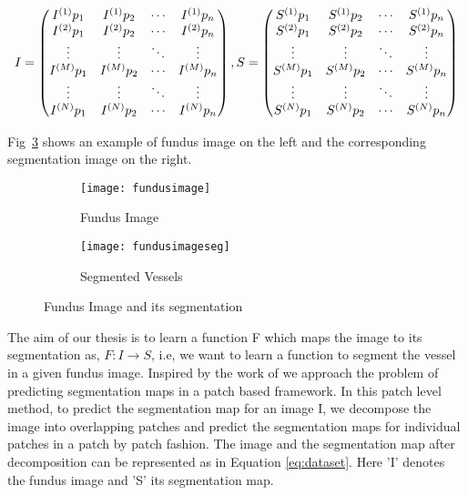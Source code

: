 \begin{equation}\label{eq:dataset}
I = 	
\begin{pmatrix}
I^{(1)}{p}_1 & I^{(1)}{p}_2 & \cdots & I^{(1)}{p}_n \\
I^{(2)}{p}_1 & I^{(2)}{p}_2 & \cdots & I^{(2)}{p}_n \\
\vdots  		  & \vdots  		  & \ddots & \vdots  \\
I^{(M)}{p}_1 & I^{(M)}{p}_2 & \cdots & I^{(M)}{p}_n \\
\vdots  		  & \vdots  		  & \ddots & \vdots  \\
I^{(N)}{p}_1 & I^{(N)}{p}_2 & \cdots & I^{(N)}{p}_n 
\end{pmatrix}
\\
,S = 	
\begin{pmatrix}
S^{(1)}{p}_1 & S^{(1)}{p}_2 & \cdots & S^{(1)}{p}_n \\
S^{(2)}{p}_1 & S^{(2)}{p}_2 & \cdots & S^{(2)}{p}_n \\
\vdots  		  & \vdots  		  & \ddots & \vdots  \\
S^{(M)}{p}_1 & S^{(M)}{p}_2 & \cdots & S^{(M)}{p}_n \\
\vdots  		  & \vdots  		  & \ddots & \vdots  \\
S^{(N)}{p}_1 & S^{(N)}{p}_2 & \cdots & S^{(N)}{p}_n 
\end{pmatrix}
\end{equation}



Fig~\ref{fig:fundus example} shows an example of fundus image on the left and the corresponding segmentation image on the right.\\

\begin{figure}
	\centering
	\begin{subfigure}[b]{0.45\textwidth}
		\centering
		\texttt{[image: fundusimage]}
		\caption{Fundus Image}
		\label{fig:fundusex}
	\end{subfigure}
	\hfill
	\begin{subfigure}[b]{0.45\textwidth}
		\centering
		\texttt{[image: fundusimageseg]}
		\caption{Segmented Vessels}
		\label{fig:fundusex seg}
	\end{subfigure}
	\caption{Fundus Image and its segmentation}
	\label{fig:fundus example}
\end{figure}

The aim of our thesis is to learn a function F which maps the image to its segmentation as, $ F: I \rightarrow S $, i.e, we want to learn a function to segment the vessel in a given fundus image. Inspired by the work of \cite{mnih2012learning, lim2013sketch} we approach the problem of predicting segmentation maps in a  patch based framework. In this patch level method, to predict the segmentation map for an image I, we decompose the image into overlapping patches and predict the segmentation maps for individual patches in a patch by patch fashion. The image and the segmentation map after decomposition can be represented as in Equation \ref{eq:dataset}. Here 'I' denotes the fundus image and 'S' its segmentation map. \\

